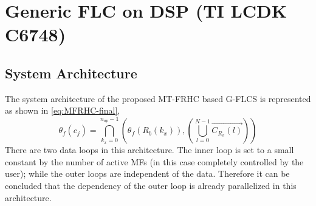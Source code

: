 \section{Generic FLC on DSP (TI LCDK C6748)}
\subsection{System Architecture}
The system architecture of the proposed MT-FRHC based G-FLCS is represented as shown in \eqref{eq:MFRHC-final},
\begin{equation} 
{\theta _f}({c_j}) = \bigcap\limits_{{k_x} = 0}^{n_{op} - 1} {\left( {{\theta _f}\left( {{R_b}\left( {{k_x}} \right)} \right),\left( {\bigcup\limits_{l = 0}^{N - 1} {\overrightarrow {{C_{{R_v}}}\left( l \right)} } } \right)} \right)} 
\end{equation}
There are two data loops in this architecture. The inner loop is set to a small constant by the number of active MFs (in this case completely controlled by the user); while the outer loops are independent of the data. Therefore it can be concluded that the dependency of the outer loop is already parallelized in this architecture.

